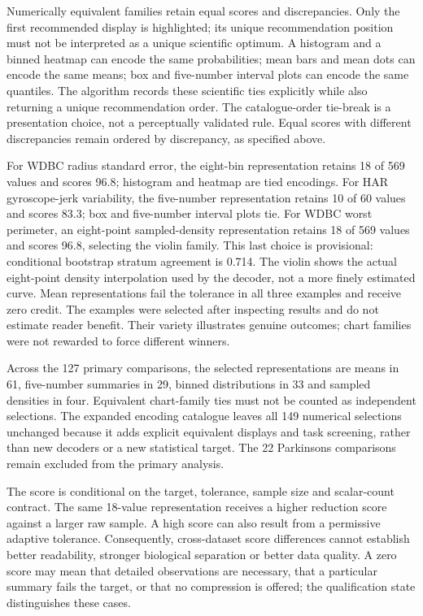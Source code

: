 \documentclass[11pt]{article}
\begin{document}
Numerically equivalent families retain equal scores and discrepancies. Only the first recommended display is highlighted; its unique recommendation position must not be interpreted as a unique scientific optimum. A histogram and a binned heatmap can encode the same probabilities; mean bars and mean dots can encode the same means; box and five-number interval plots can encode the same quantiles. The algorithm records these scientific ties explicitly while also returning a unique recommendation order. The catalogue-order tie-break is a presentation choice, not a perceptually validated rule. Equal scores with different discrepancies remain ordered by discrepancy, as specified above.

For WDBC radius standard error, the eight-bin representation retains 18 of 569 values and scores 96.8; histogram and heatmap are tied encodings. For HAR gyroscope-jerk variability, the five-number representation retains 10 of 60 values and scores 83.3; box and five-number interval plots tie. For WDBC worst perimeter, an eight-point sampled-density representation retains 18 of 569 values and scores 96.8, selecting the violin family.\cite{wdbc,har} This last choice is provisional: conditional bootstrap stratum agreement is 0.714. The violin shows the actual eight-point density interpolation used by the decoder, not a more finely estimated curve. Mean representations fail the tolerance in all three examples and receive zero credit. The examples were selected after inspecting results and do not estimate reader benefit. Their variety illustrates genuine outcomes; chart families were not rewarded to force different winners.

Across the 127 primary comparisons, the selected representations are means in 61, five-number summaries in 29, binned distributions in 33 and sampled densities in four. Equivalent chart-family ties must not be counted as independent selections. The expanded encoding catalogue leaves all 149 numerical selections unchanged because it adds explicit equivalent displays and task screening, rather than new decoders or a new statistical target. The 22 Parkinsons comparisons remain excluded from the primary analysis.


The score is conditional on the target, tolerance, sample size and scalar-count contract. The same 18-value representation receives a higher reduction score against a larger raw sample. A high score can also result from a permissive adaptive tolerance. Consequently, cross-dataset score differences cannot establish better readability, stronger biological separation or better data quality. A zero score may mean that detailed observations are necessary, that a particular summary fails the target, or that no compression is offered; the qualification state distinguishes these cases.
\end{document}
